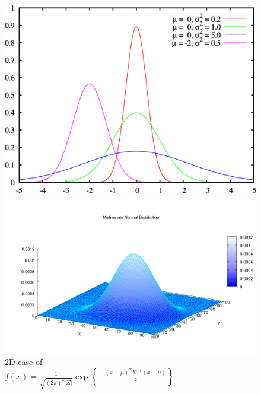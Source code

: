 {\begin{figure}[h!]
  \centering
  \begin{minipage}[b]{0.4\textwidth}
        \includegraphics[scale=0.1]{1D.png}
   \caption{$f(x) = \frac{1}{\sqrt{2\pi\sigma^2} } e^{ -\frac{(x-\mu)^2}{2\sigma^2} } $}
  \end{minipage}
  \hfill
  \begin{minipage}[b]{0.5\textwidth}
       \includegraphics[scale=0.1]{2D.png}
   \caption{
   \begingroup
\footnotesize%
2D case of\\ $f\left(x\right)=\frac{1}{\sqrt{\left(2\pi\right)^{2}\left|\Sigma\right|}}\exp\left\{ -\frac{\left(x-\mu\right)^{T}\Sigma^{-1}\left(x-\mu\right)}{2}\right\} $
\endgroup}
  \end{minipage}
\end{figure}

}
